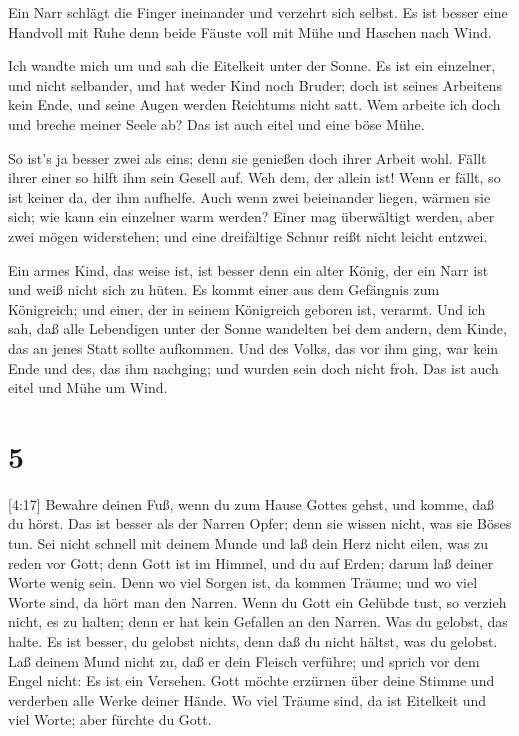 Ein Narr schlägt die Finger ineinander und verzehrt sich
selbst.  Es ist besser eine Handvoll mit Ruhe denn beide
Fäuste voll mit Mühe und Haschen nach Wind.

 Ich wandte mich um und sah die Eitelkeit unter der Sonne.
 Es ist ein einzelner, und nicht selbander, und hat weder
Kind noch Bruder; doch ist seines Arbeitens kein Ende, und seine Augen
werden Reichtums nicht satt. Wem arbeite ich doch und breche meiner
Seele ab? Das ist auch eitel und eine böse Mühe.

 So ist's ja besser zwei als eins; denn sie genießen doch
ihrer Arbeit wohl.  Fällt ihrer einer so hilft ihm sein
Gesell auf. Weh dem, der allein ist! Wenn er fällt, so ist keiner da,
der ihm aufhelfe.  Auch wenn zwei beieinander liegen,
wärmen sie sich; wie kann ein einzelner warm werden?  Einer
mag überwältigt werden, aber zwei mögen widerstehen; und eine
dreifältige Schnur reißt nicht leicht entzwei.

 Ein armes Kind, das weise ist, ist besser denn ein alter
König, der ein Narr ist und weiß nicht sich zu hüten.  Es
kommt einer aus dem Gefängnis zum Königreich; und einer, der in seinem
Königreich geboren ist, verarmt.  Und ich sah, daß alle
Lebendigen unter der Sonne wandelten bei dem andern, dem Kinde, das an
jenes Statt sollte aufkommen.  Und des Volks, das vor ihm
ging, war kein Ende und des, das ihm nachging; und wurden sein doch
nicht froh. Das ist auch eitel und Mühe um Wind.

\hypertarget{section-4}{%
\section{5}\label{section-4}}

 {[}4:17{]} Bewahre deinen Fuß, wenn du zum Hause Gottes
gehst, und komme, daß du hörst. Das ist besser als der Narren Opfer;
denn sie wissen nicht, was sie Böses tun.  Sei nicht schnell
mit deinem Munde und laß dein Herz nicht eilen, was zu reden vor Gott;
denn Gott ist im Himmel, und du auf Erden; darum laß deiner Worte wenig
sein.  Denn wo viel Sorgen ist, da kommen Träume; und wo
viel Worte sind, da hört man den Narren.  Wenn du Gott ein
Gelübde tust, so verzieh nicht, es zu halten; denn er hat kein Gefallen
an den Narren. Was du gelobst, das halte.  Es ist besser, du
gelobst nichts, denn daß du nicht hältst, was du gelobst. 
Laß deinem Mund nicht zu, daß er dein Fleisch verführe; und sprich vor
dem Engel nicht: Es ist ein Versehen. Gott möchte erzürnen über deine
Stimme und verderben alle Werke deiner Hände.  Wo viel
Träume sind, da ist Eitelkeit und viel Worte; aber fürchte du Gott.

